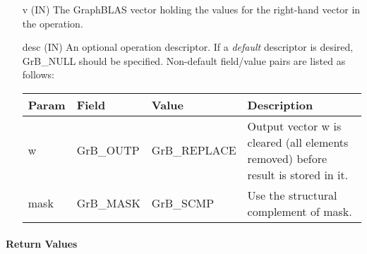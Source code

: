 \begin{itemize}[leftmargin=1.1in]
    \item[{\sf v}]     ({\sf IN}) The GraphBLAS vector holding the values for
    the right-hand vector in the operation.

    \item[{\sf desc}] ({\sf IN}) An optional operation descriptor. If
    a \emph{default} descriptor is desired, {\sf GrB\_NULL} should be
    specified. Non-default field/value pairs are listed as follows:  \\

    \begin{tabular}{lllp{2.5in}}
        Param & Field  & Value & Description \\
        \hline
        {\sf w}    & {\sf GrB\_OUTP} & {\sf GrB\_REPLACE} & Output vector {\sf w}
        is cleared (all elements removed) before result is stored in it. \\
        {\sf mask} & {\sf GrB\_MASK} & {\sf GrB\_SCMP}   & Use the structural
        complement of {\sf mask}. \\
    \end{tabular}
\end{itemize}

\paragraph{Return Values}

